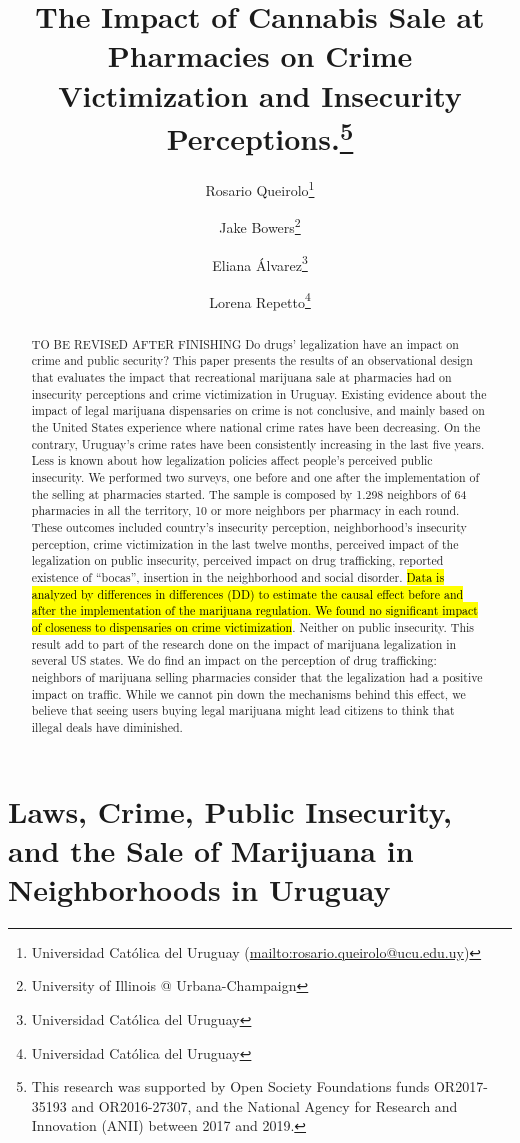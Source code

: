 \documentclass[11pt]{article}
\author{Rosario Queirolo\thanks{Universidad Católica del Uruguay (\url{mailto:rosario.queirolo@ucu.edu.uy})}
	\and Jake Bowers\thanks{University of Illinois @ Urbana-Champaign}
	\and Eliana Álvarez\thanks{Universidad Católica del Uruguay}
	\and Lorena Repetto\thanks{Universidad Católica del Uruguay}}
\title{The Impact of Cannabis Sale at Pharmacies on Crime Victimization and Insecurity Perceptions.\thanks{This research was supported by Open Society Foundations funds OR2017-35193 and OR2016-27307, and the National Agency for Research and Innovation (ANII) between 2017 and 2019.}}
\begin{document}
\maketitle


\begin{abstract}
TO BE REVISED AFTER FINISHING Do drugs' legalization have an impact on crime and public security? This paper presents the results of an observational design that evaluates the impact that recreational marijuana sale at pharmacies had on insecurity perceptions and crime victimization in Uruguay. Existing evidence about the impact of legal marijuana dispensaries on crime is not conclusive, and mainly based on the United States experience where national crime rates have been decreasing. On the contrary, Uruguay's crime rates have been consistently increasing in the last five years. Less is known about how legalization policies affect people's perceived public insecurity. We performed two surveys, one before and one after the implementation of the selling at pharmacies started. The sample is composed by 1.298 neighbors of 64 pharmacies in all the territory, 10 or more neighbors per pharmacy in each round. These outcomes included country’s insecurity perception, neighborhood’s insecurity perception, crime victimization in the last twelve months, perceived impact of the legalization on public insecurity, perceived impact on drug trafficking, reported existence of ``bocas'', insertion in the neighborhood and social disorder. \hl{Data is analyzed by differences in differences (DD) to estimate the causal effect before and after the implementation of the marijuana regulation. We found no significant impact of closeness to dispensaries on crime victimization}. Neither on public insecurity. This result add to part of the research done on the impact of marijuana legalization in several US states. We do find an impact on the perception of drug trafficking: neighbors of marijuana selling pharmacies consider that the legalization had a positive impact on traffic. While we cannot pin down the mechanisms behind this effect, we believe that seeing users buying legal marijuana might lead citizens to think that illegal deals have diminished.

\end{abstract}

\section[]{Laws, Crime, Public Insecurity, and the Sale of Marijuana in Neighborhoods in Uruguay}
\end{document}
